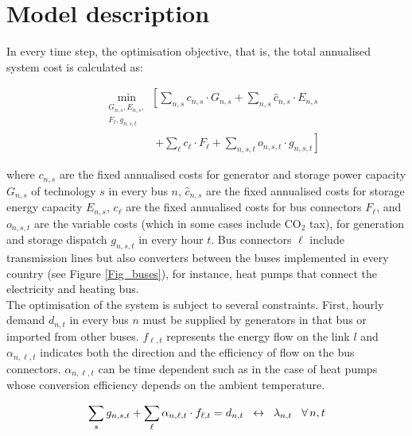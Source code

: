 \documentclass[3p]{elsarticle} %
\begin{document}
\FloatBarrier

\section{Model description}

In every time step, the optimisation objective, that is, the total annualised system cost is calculated as:

\begin{align}
& \min_{\substack{G_{n,s},E_{n,s},\\F_\ell,g_{n,s,t}}} \left[ \sum_{n,s} c_{n,s} \cdot G_{n,s} +\sum_{n,s} \hat{c}_{n,s} \cdot E_{n,s} \right. \nonumber \\
& \hspace{2cm} \left. + \sum_{\ell} c_{\ell} \cdot F_{\ell}+ \sum_{n,s,t} o_{n,s,t} \cdot g_{n,s,t} \right]
\label{eq_objective}
\end{align}

where $c_{n,s}$ are the fixed annualised costs for generator and storage power capacity $G_{n,s}$ of technology $s$ in every bus $n$, $\hat{c}_{n,s}$ are the fixed annualised costs for storage energy capacity $E_{n,s}$, $c_\ell$ are the fixed annualised costs for bus connectors $F_{\ell}$, and $o_{n,s,t}$ are the variable costs (which in some cases include CO$_2$ tax), for generation and storage dispatch $g_{n,s,t}$ in every hour $t$. Bus connectors $\ell$ include transmission lines but also converters between the buses implemented in every country (see Figure \ref{Fig_buses}), for instance, heat pumps that connect the electricity and heating bus. \\

The optimisation of the system is subject to several constraints. First, hourly demand $d_{n,t}$ in every bus $n$ must be supplied by generators in that bus or imported from other buses. $f_{\ell,t}$ represents the energy flow on the link $l$ and $\alpha_{n,\ell,t}$ indicates both the direction and the efficiency of flow on the bus connectors.  $\alpha_{n,\ell,t}$ can be time dependent such as in the case of heat pumps whose conversion efficiency depends on the ambient temperature.

\begin{equation}
\sum_{s} g_{n,s,t}+ \sum_{\ell} \alpha_{n,\ell,t}\cdot f_{\ell,t} = d_{n,t} \hspace{.2cm} \leftrightarrow \hspace{0.2cm} \lambda_{n,t} \hspace{.3cm} \forall\, n,t \label{eq_energy_balance}
\end{equation}
\end{document}
